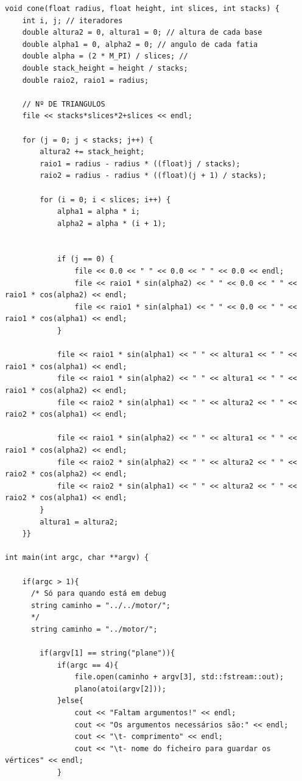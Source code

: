 \documentclass{report}
\begin{document}
\begin{lstlisting}
void cone(float radius, float height, int slices, int stacks) {
    int i, j; // iteradores
    double altura2 = 0, altura1 = 0; // altura de cada base
    double alpha1 = 0, alpha2 = 0; // angulo de cada fatia
    double alpha = (2 * M_PI) / slices; //
    double stack_height = height / stacks;
    double raio2, raio1 = radius;

    // Nº DE TRIANGULOS
    file << stacks*slices*2+slices << endl;

    for (j = 0; j < stacks; j++) {
        altura2 += stack_height;
        raio1 = radius - radius * ((float)j / stacks);
        raio2 = radius - radius * ((float)(j + 1) / stacks);

        for (i = 0; i < slices; i++) {
            alpha1 = alpha * i;
            alpha2 = alpha * (i + 1);


            if (j == 0) {
                file << 0.0 << " " << 0.0 << " " << 0.0 << endl;
                file << raio1 * sin(alpha2) << " " << 0.0 << " " << raio1 * cos(alpha2) << endl;
                file << raio1 * sin(alpha1) << " " << 0.0 << " " << raio1 * cos(alpha1) << endl;
            }

            file << raio1 * sin(alpha1) << " " << altura1 << " " << raio1 * cos(alpha1) << endl;
            file << raio1 * sin(alpha2) << " " << altura1 << " " << raio1 * cos(alpha2) << endl;
            file << raio2 * sin(alpha1) << " " << altura2 << " " << raio2 * cos(alpha1) << endl;

            file << raio1 * sin(alpha2) << " " << altura1 << " " << raio1 * cos(alpha2) << endl;
            file << raio2 * sin(alpha2) << " " << altura2 << " " << raio2 * cos(alpha2) << endl;
            file << raio2 * sin(alpha1) << " " << altura2 << " " << raio2 * cos(alpha1) << endl;
        }
        altura1 = altura2;
    }}

int main(int argc, char **argv) {

    if(argc > 1){
      /* Só para quando está em debug
      string caminho = "../../motor/";
      */
      string caminho = "../motor/";

        if(argv[1] == string("plane")){
            if(argc == 4){
                file.open(caminho + argv[3], std::fstream::out);
                plano(atoi(argv[2]));
            }else{
                cout << "Faltam argumentos!" << endl;
                cout << "Os argumentos necessários são:" << endl;
                cout << "\t- comprimento" << endl;
                cout << "\t- nome do ficheiro para guardar os vértices" << endl;
            }


\end{lstlisting}
\end{document}
